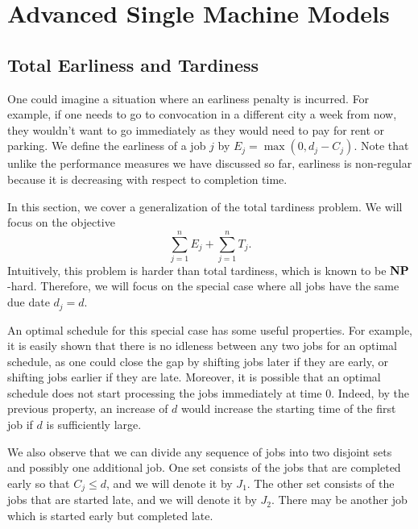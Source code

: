 \section{Advanced Single Machine Models} \label{sec:5}

\subsection{Total Earliness and Tardiness} \label{subsec:5.1}
One could imagine a situation where an earliness penalty is incurred. For 
example, if one needs to go to convocation in a different city a week from now, 
they wouldn't want to go immediately as they would need to pay for rent 
or parking.  We define the earliness of a job $j$ by $E_j = \max(0, d_j - C_j)$.
Note that unlike the performance measures we have discussed so far, 
earliness is non-regular because it is decreasing with respect to 
completion time. 

In this section, we cover a generalization of the total tardiness 
problem. We will focus on the objective 
\[ \sum_{j=1}^n E_j + \sum_{j=1}^n T_j. \] 
Intuitively, this problem is harder than total tardiness, which is known to be 
$\operatorname{\textbf{NP}}$-hard. Therefore, we will focus on the special case where all 
jobs have the same due date $d_j = d$. 

An optimal schedule for this special case has some useful properties. For 
example, it is easily shown that there is no idleness between any two jobs 
for an optimal schedule, as one could close the gap by shifting jobs 
later if they are early, or shifting jobs earlier if they are late. 
Moreover, it is possible that an optimal schedule does not start processing 
the jobs immediately at time $0$. Indeed, by the previous property, 
an increase of $d$ would increase the starting time of the first job if 
$d$ is sufficiently large. 

We also observe that we can divide any sequence of jobs into 
two disjoint sets and possibly one additional job. One set consists of the jobs 
that are completed early so that $C_j \leq d$, and we will denote it by $J_1$. 
The other set consists of the jobs that are started late, and we will denote it 
by $J_2$. There may be another job which is started early but 
completed late. 

